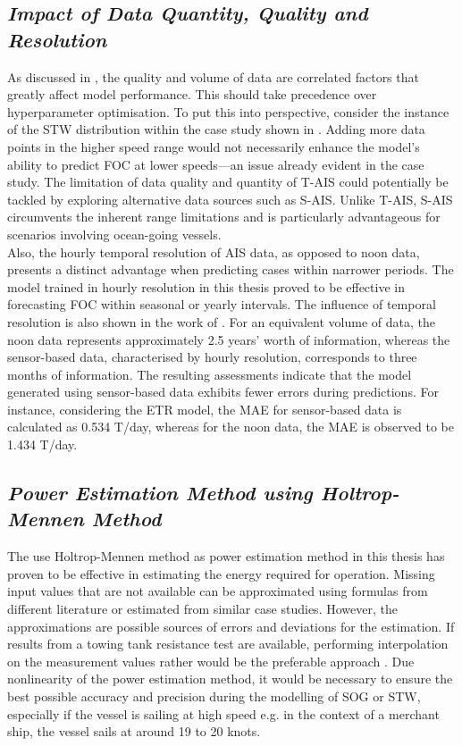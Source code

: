 \subsection*{\emph{Impact of Data Quantity, Quality and Resolution}}

As discussed in , the quality and volume of data are correlated factors that greatly affect model performance. This should take precedence over hyperparameter optimisation. To put this into perspective, consider the instance of the STW distribution within the case study shown in . Adding more data points in the higher speed range would not necessarily enhance the model's ability to predict FOC at lower speeds—an issue already evident in the case study. The limitation of data quality and quantity of T-AIS could potentially be tackled by exploring alternative data sources such as S-AIS. Unlike T-AIS, S-AIS circumvents the inherent range limitations and is particularly advantageous for scenarios involving ocean-going vessels.\\   

Also, the hourly temporal resolution of AIS data, as opposed to noon data, presents a distinct advantage when predicting cases within narrower periods. The model trained in hourly resolution in this thesis proved to be effective in forecasting FOC within seasonal or yearly intervals. The influence of temporal resolution is also shown in the work of . For an equivalent volume of data, the noon data represents approximately 2.5 years' worth of information, whereas the sensor-based data, characterised by hourly resolution, corresponds to three months of information. The resulting assessments indicate that the model generated using sensor-based data exhibits fewer errors during predictions. For instance, considering the ETR model, the MAE for sensor-based data is calculated as 0.534 T/day, whereas for the noon data, the MAE is observed to be 1.434 T/day.\\

\subsection*{\emph{Power Estimation Method using Holtrop-Mennen Method}}


The use Holtrop-Mennen method as power estimation method in this thesis has proven to be effective in estimating the energy required for operation. Missing input values that are not available can be approximated using formulas from different literature or estimated from similar case studies. However, the approximations are possible sources of errors and deviations for the estimation. If results from a towing tank resistance test are available, performing interpolation on the measurement values rather would be the preferable approach . Due nonlinearity of the power estimation method, it would be necessary to ensure the best possible accuracy and precision during the modelling of SOG or STW, especially if the vessel is sailing at high speed e.g. in the context of a merchant ship, the vessel sails at around 19 to 20 knots.\\ 

